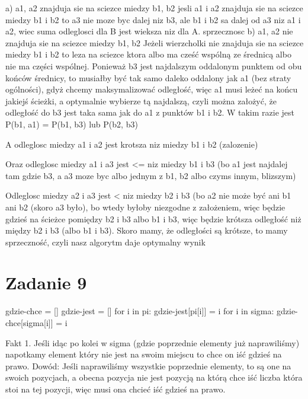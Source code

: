 \documentclass[12pt]{article}
\begin{document}
a) a1, a2 znajduja sie na sciezce miedzy b1, b2
jesli a1 i a2 znajduja sie na sciezce miedzy b1 i b2 to a3 nie moze byc dalej niz b3, ale b1 i b2 sa dalej od a3 niz a1 i a2, wiec suma odleglosci dla B jest wieksza niz dla A. 
sprzecznosc
b) a1, a2 nie znajduja sie na sciezce miedzy b1, b2
Jeżeli wierzcholki nie znajduja sie na sciezce miedzy b1 i b2 to leza na sciezce ktora albo ma cześć wspólną ze średnicą albo nie ma części wspólnej. Ponieważ b3 jest najdalszym oddalonym punktem od obu końców średnicy, to musiałby być tak samo daleko oddalony jak a1 (bez straty ogólności), gdyż chcemy maksymalizować odległość, więc a1 musi leżeć na końcu jakiejś ścieżki, a optymalnie wybierze tą najdalszą, czyli można założyć, że odległość do b3 jest taka sama jak do a1 z punktów b1 i b2.
W takim razie jest P(b1, a1) = P(b1, b3) lub P(b2, b3)

A odleglosc miedzy a1 i a2 jest krotsza niz miedzy b1 i b2 (zalozenie)

Oraz odleglosc miedzy a1 i a3 jest <= niz miedzy b1 i b3 (bo a1 jest najdalej tam gdzie b3, a a3 moze byc albo jednym z {b1, b2} albo czyms innym, blizszym)

Odleglosc miedzy a2 i a3 jest < niz miedzy b2 i b3 (bo a2 nie może być ani b1 ani b2 (skoro a3 było), bo wtedy byłoby niezgodne z założeniem, więc będzie gdzieś na ścieżce pomiędzy b2 i b3 albo b1 i b3, więc będzie krótsza odległość niż między b2 i b3 (albo b1 i b3).
Skoro mamy, że odległości są krótsze, to mamy sprzeczność, czyli nasz algorytm daje optymalny wynik

\section{Zadanie 9}

gdzie-chce = []
gdzie-jest = []
for i in pi:
    gdzie-jest[pi[i]] = i
for i in sigma:
    gdzie-chce[sigma[i]] = i 


Fakt 1.
Jeśli idąc po kolei w sigma (gdzie poprzednie elementy już naprawiliśmy) napotkamy element który nie jest na swoim miejscu to chce on iść gdzieś na prawo.
Dowód:
Jeśli naprawiliśmy wszystkie poprzednie elementy, to są one na swoich pozycjach, a obecna pozycja nie jest pozycją na którą chce iść liczba która stoi na tej pozycji, więc musi ona chcieć iść gdzieś na prawo.
\end{document}
